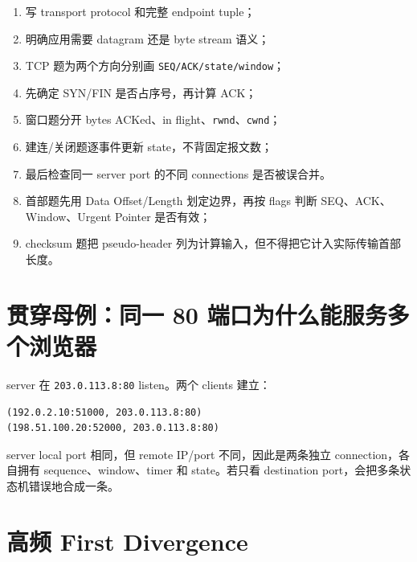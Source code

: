 \documentclass[UTF8,fontset=none,11pt,a4paper]{ctexart}
\providecommand{\tightlist}{\setlength{\itemsep}{0pt}\setlength{\parskip}{0pt}}
\providecommand{\passthrough}[1]{#1}
\begin{document}
\begin{enumerate}
\def\labelenumi{\arabic{enumi}.}
\tightlist
\item
  写 transport protocol 和完整 endpoint tuple；
\item
  明确应用需要 datagram 还是 byte stream 语义；
\item
  TCP 题为两个方向分别画
  \passthrough{\lstinline!SEQ/ACK/state/window!}；
\item
  先确定 SYN/FIN 是否占序号，再计算 ACK；
\item
  窗口题分开 bytes ACKed、in
  flight、\passthrough{\lstinline!rwnd!}、\passthrough{\lstinline!cwnd!}；
\item
  建连/关闭题逐事件更新 state，不背固定报文数；
\item
  最后检查同一 server port 的不同 connections 是否被误合并。
\item
  首部题先用 Data Offset/Length 划定边界，再按 flags 判断 SEQ、ACK、Window、Urgent Pointer 是否有效；
\item
  checksum 题把 pseudo-header 列为计算输入，但不得把它计入实际传输首部长度。
\end{enumerate}

\section{贯穿母例：同一 80
端口为什么能服务多个浏览器}\label{13-ux8d2fux7a7fux6bcdux4f8bux540cux4e00-80-ux7aefux53e3ux4e3aux4ec0ux4e48ux80fdux670dux52a1ux591aux4e2aux6d4fux89c8ux5668}

server 在 \passthrough{\lstinline!203.0.113.8:80!} listen。两个 clients
建立：

\begin{lstlisting}
(192.0.2.10:51000, 203.0.113.8:80)
(198.51.100.20:52000, 203.0.113.8:80)
\end{lstlisting}

server local port 相同，但 remote IP/port 不同，因此是两条独立
connection，各自拥有 sequence、window、timer 和 state。若只看
destination port，会把多条状态机错误地合成一条。

\section{高频 First
Divergence}\label{14-ux9ad8ux9891-first-divergence}
\end{document}
